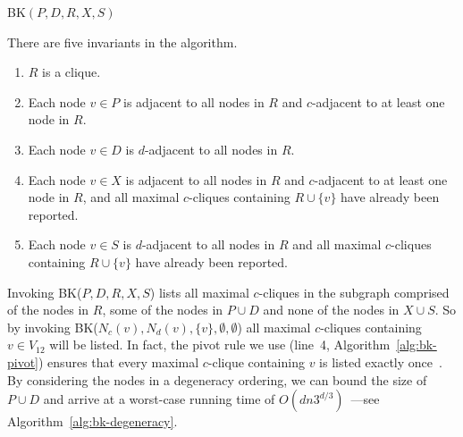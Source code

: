 \documentclass[11pt]{article}
\begin{document}
\begin{algorithm2e}
  \caption{\textsc{BK}$(P,D,R,X,S)$}
  \label{alg:bk-pivot}
\end{algorithm2e}

There are five invariants in the algorithm.

\begin{enumerate}
  \item $R$ is a clique.
  \item Each node $v \in P$ is adjacent to all nodes in $R$ and $c$-adjacent to
    at least one node in $R$.
  \item Each node $v \in D$ is $d$-adjacent to all nodes in $R$.
  \item Each node $v \in X$ is adjacent to all nodes in $R$ and $c$-adjacent to
    at least one node in $R$, and all maximal
    $c$-cliques containing $R \cup \{v\}$ have already been reported.
  \item Each node $v \in S$ is $d$-adjacent to all nodes in $R$ and all maximal
    $c$-cliques containing $R \cup \{v\}$ have already been reported.
\end{enumerate}

Invoking \textsc{BK}($P, D, R, X, S$) lists all maximal $c$-cliques in the
subgraph comprised of the nodes in $R$, some of the nodes in $P \cup D$
and none of the nodes in $X \cup S$. So by invoking \textsc{BK}($N_c(v),
N_d(v), \{ v \}, \emptyset, \emptyset$) all maximal $c$-cliques containing $v
\in V_{12}$ will be listed. In fact, the pivot rule we use (line~4,
Algorithm~\ref{alg:bk-pivot}) ensures that every maximal $c$-clique containing
$v$ is listed exactly once~\cite{Tomita:2006kb}. By considering the nodes in a
degeneracy ordering, we can bound the size of $P \cup D$ and arrive at a
worst-case running time of $O(dn3^{d/3})$~\cite{Eppstein:2010uq}---see
Algorithm~\ref{alg:bk-degeneracy}.
\end{document}
